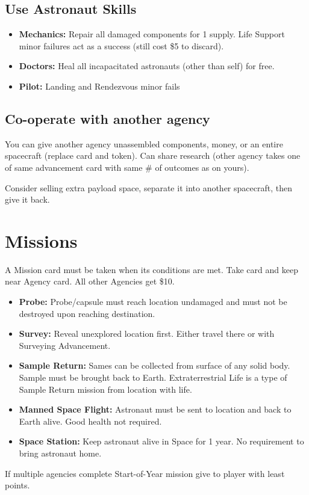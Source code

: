 \documentclass[12pt]{article}
\newenvironment{itemizeCustom}
{\begin{itemize}
  \setlength{\itemsep}{1pt}
  \setlength{\parskip}{0pt}
  \setlength{\parsep}{0pt}}
{\end{itemize}}
\begin{document}
\begin{multicols*}{2}
\subsection*{Use Astronaut Skills}
\begin{itemizeCustom}
    \item \textbf{Mechanics:} Repair all damaged components for 1 supply. Life Support minor failures act as a success (still cost \$5 to discard).
    \item \textbf{Doctors:} Heal all incapacitated astronauts (other than self) for free.
    \item \textbf{Pilot:} Landing and Rendezvous minor fails
\end{itemizeCustom}

\subsection*{Co-operate with another agency}
You can give another agency unassembled components, money, or an entire spacecraft (replace card and token). Can share research (other agency takes one of same advancement card with same \# of outcomes as on yours).

Consider selling extra payload space, separate it into another spacecraft, then give it back.

\section*{Missions}
A Mission card must be taken when its conditions are met. Take card and keep near Agency card. All other Agencies get \$10.
\begin{itemizeCustom}
    \item \textbf{Probe:} Probe/capsule must reach location undamaged and must not be destroyed upon reaching destination.
    \item \textbf{Survey:} Reveal unexplored location first. Either travel there or with Surveying Advancement.
    \item \textbf{Sample Return:} Sames can be collected from surface of any solid body. Sample must be brought back to Earth. Extraterrestrial Life is a type of Sample Return mission from location with life.
    \item \textbf{Manned Space Flight:} Astronaut must be sent to location and back to Earth alive. Good health not required.
    \item \textbf{Space Station:} Keep astronaut alive in Space for 1 year. No requirement to bring astronaut home.
\end{itemizeCustom}
If multiple agencies complete Start-of-Year mission give to player with least points.


\end{multicols*}
\end{document}
